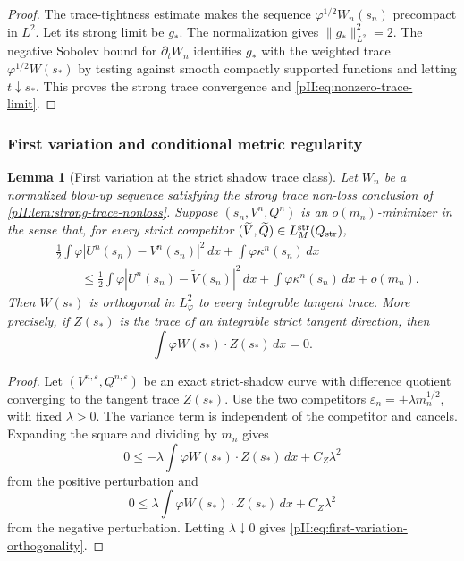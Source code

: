 \documentclass[11pt]{article}
\numberwithin{equation}{section}
\theoremstyle{plain}
\newtheorem{lemma}{Lemma}[section]
\theoremstyle{definition}
\theoremstyle{remark}
\newcommand{\str}{\mathrm{str}}
\newcommand{\dx}{\,dx}
\begin{document}
\begin{proof}
The trace-tightness estimate makes the sequence $\varphi^{1/2}W_n(s_n)$ precompact in $L^2$.  Let its strong limit be $g_*$.  The normalization gives $\|g_*\|_{L^2}^2=2$.  The negative Sobolev bound for $\partial_tW_n$ identifies $g_*$ with the weighted trace $\varphi^{1/2}W(s_*)$ by testing against smooth compactly supported functions and letting $t\downarrow s_*$.  This proves the strong trace convergence and \eqref{pII:eq:nonzero-trace-limit}.
\end{proof}

\subsubsection{First variation and conditional metric regularity}

\begin{lemma}[First variation at the strict shadow trace class]\label{pII:lem:first-variation-tangent}
Let $W_n$ be a normalized blow-up sequence satisfying the strong trace non-loss conclusion of \cref{pII:lem:strong-trace-nonloss}.  Suppose $(s_n,V^n,Q^n)$ is an $o(m_n)$-minimizer in the sense that, for every strict competitor $(\widetilde V,\widetilde Q)\in L_M^{\str}(Q_{\rm str})$,
\[
\begin{aligned}
&\frac12\int\varphi|U^n(s_n)-V^n(s_n)|^2\dx
+
\int\varphi\kappa^n(s_n)\dx \\
&\qquad\le
\frac12\int\varphi|U^n(s_n)-\widetilde V(s_n)|^2\dx
+
\int\varphi\kappa^n(s_n)\dx+o(m_n).
\end{aligned}
\]
Then $W(s_*)$ is orthogonal in $L^2_\varphi$ to every integrable tangent trace.  More precisely, if $Z(s_*)$ is the trace of an integrable strict tangent direction, then
\begin{equation}\label{pII:eq:first-variation-orthogonality}
        \int\varphi W(s_*)\cdot Z(s_*)\dx=0.
\end{equation}
\end{lemma}

\begin{proof}
Let $(V^{n,\varepsilon},Q^{n,\varepsilon})$ be an exact strict-shadow curve with difference quotient converging to the tangent trace $Z(s_*)$.  Use the two competitors $\varepsilon_n=\pm\lambda m_n^{1/2}$, with fixed $\lambda>0$.  The variance term is independent of the competitor and cancels.  Expanding the square and dividing by $m_n$ gives
\[
        0\le -\lambda\int\varphi W(s_*)\cdot Z(s_*)\dx+C_Z\lambda^2
\]
from the positive perturbation and
\[
        0\le \lambda\int\varphi W(s_*)\cdot Z(s_*)\dx+C_Z\lambda^2
\]
from the negative perturbation.  Letting $\lambda\downarrow0$ gives \eqref{pII:eq:first-variation-orthogonality}.
\end{proof}
\end{document}
